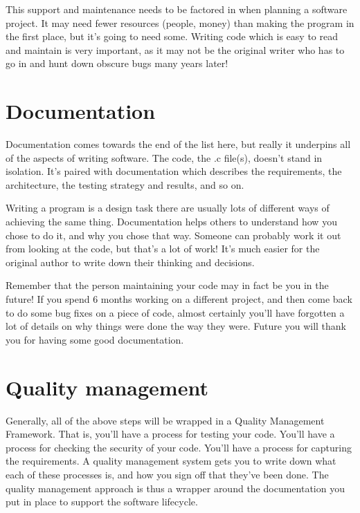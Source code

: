 \documentclass[letterpaper,10pt,british]{sphinxmanual}
\begin{document}
\sphinxAtStartPar
This support and maintenance needs to be factored in when planning a software project. It may need fewer resources (people, money) than making the program in the first place, but it’s going to need some. Writing code which is easy to read and maintain is very important, as it may not be the original writer who has to go in and hunt down obscure bugs many years later!

\sphinxstepscope


\section{Documentation}
\label{\detokenize{chapters/software_lifecycle/documentation:documentation}}\label{\detokenize{chapters/software_lifecycle/documentation::doc}}
\sphinxAtStartPar
Documentation comes towards the end of the list here, but really it underpins all of the aspects of writing software. The code, the .c file(s), doesn’t stand in isolation. It’s paired with documentation which describes the requirements, the architecture, the testing strategy and results, and so on.

\sphinxAtStartPar
Writing a program is a design task \sphinxhyphen{} there are usually lots of different ways of achieving the same thing. Documentation helps others to understand how you chose to do it, and why you chose that way. Someone can probably work it out from looking at the code, but that’s a lot of work! It’s much easier for the original author to write down their thinking and decisions.

\sphinxAtStartPar
Remember that the person maintaining your code may in fact be you in the future! If you spend 6 months working on a different project, and then come back to do some bug fixes on a piece of code, almost certainly you’ll have forgotten a lot of details on why things were done the way they were. Future you will thank you for having some good documentation.

\sphinxstepscope


\section{Quality management}
\label{\detokenize{chapters/software_lifecycle/quality_management:quality-management}}\label{\detokenize{chapters/software_lifecycle/quality_management::doc}}
\sphinxAtStartPar
Generally, all of the above steps will be wrapped in a Quality Management Framework. That is, you’ll have a process for testing your code. You’ll have a process for checking the security of your code. You’ll have a process for capturing the requirements. A quality management system gets you to write down what each of these processes is, and how you sign off that they’ve been done. The quality management approach is thus a wrapper around the documentation you put in place to support the software lifecycle.
\end{document}
